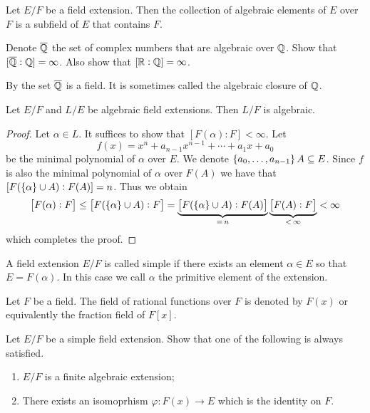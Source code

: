 \documentclass[11pt,a4paper]{article}
\begin{document}
\begin{corollary}
  \label{cor:algebraic-closure-is-field}
  Let $E/F$ be a field extension.
  Then the collection of algebraic elements of $E$ over $F$
  is a subfield of $E$ that contains $F$.
\end{corollary}

\begin{exercise}
  Denote $\overline {\mathbb{Q}}$ the set of complex numbers that are
  algebraic over $\mathbb{Q}$.
  Show that $[\overline {\mathbb{Q}} : \mathbb{Q}] = \infty$.
  Also show that $[\mathbb{R} : \mathbb{Q}] = \infty$.
\end{exercise}

\begin{remark}
  By 
  the set $\overline{\mathbb{Q}}$ is a field.
  It is sometimes called the algebraic closure of $\mathbb{Q}$.
\end{remark}

\begin{corollary}
  Let $E/F$ and $L/E$ be algebraic field extensions.
  Then $L/F$ is algebraic.
\end{corollary}
\begin{proof}
  Let $\alpha \in L$.
  It suffices to show that $\left[F(\alpha) : F\right] < \infty$.
  Let
  \[
    f(x) = x^n + a_{n-1} x^{n-1} + \cdots + a_1 x + a_0
  \]
  be the minimal polynomial of $\alpha$ over $E$.
  We denote $\left\{a_{0},\dots,a_{n-1}\right\} A \subseteq E$.
  Since $f$ is also the minimal polynomial of $\alpha$ over $F(A)$
  we have that $[F(\left\{\alpha\right\} \cup A) : F(A)] = n$.
  Thus we obtain
  \[
    \left[F(\alpha) : F\right] \le
    \left[F(\left\{\alpha\right\} \cup A) : F\right] =
    \underbrace{\left[F(\left\{\alpha\right\} \cup A) : F(A)\right]}_{=\,n}
    \underbrace{\left[F(A) : F\right]}_{<\,\infty} < \infty
  \]
  which completes the proof.
\end{proof}

\begin{definition}
  A field extension $E/F$ is called simple if there exists an element
  $\alpha \in E$ so that $E = F(\alpha)$.
  In this case we call $\alpha$ the primitive element of the extension.
\end{definition}

\begin{definition}
  Let $F$ be a field.
  The field of rational functions over $F$ is denoted by $F(x)$
  or equivalently the fraction field of $F[x]$.
\end{definition}

\begin{exercise}
  Let $E/F$ be a simple field extension.
  Show that one of the following is always satisfied.
  \begin{enumerate}
    \item[(1)] $E/F$ is a finite algebraic extension;
    \item[(2)] There exists an isomoprhism $\varphi \colon F(x) \to E$
      which is the identity on $F$.
  \end{enumerate}
\end{exercise}
\end{document}
